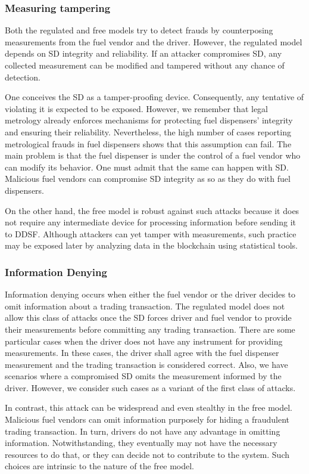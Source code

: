 \documentclass[sigplan]{acmart}
\begin{document}
\subsubsection{Measuring tampering}
Both the regulated and free models try to detect frauds by counterposing measurements from the fuel vendor and the driver.
However, the regulated model depends on SD integrity and reliability.
If an attacker compromises SD, any collected measurement can be modified and tampered without any chance of detection.

One conceives the SD as a tamper-proofing device.
Consequently, any tentative of violating it is expected to be exposed.
However, we remember that legal metrology already enforces mechanisms for protecting fuel dispensers' integrity and ensuring their reliability.
Nevertheless, the high number of cases reporting metrological frauds in fuel dispensers shows that this assumption can fail.
The main problem is that the fuel dispenser is under the control of a fuel vendor who can modify its behavior.
One must admit that the same can happen with SD.
Malicious fuel vendors can compromise SD integrity as so as they do with fuel dispensers.

On the other hand, the free model is robust against such attacks because it does not require any intermediate device for processing information before sending it to DDSF.
Although attackers can yet tamper with measurements, such practice may be exposed later by analyzing data in the blockchain using statistical tools.

\subsubsection{Information Denying}
Information denying occurs when either the fuel vendor or the driver decides to omit information about a trading transaction.
The regulated model does not allow this class of attacks once the SD forces driver and fuel vendor to provide their measurements before committing any trading transaction.
There are some particular cases when the driver does not have any instrument for providing measurements.
In these cases, the driver shall agree with the fuel dispenser measurement and the trading transaction is considered correct.
Also, we have scenarios where a compromised SD omits the measurement informed by the driver.
However, we consider such cases as a variant of the first class of attacks.

In contrast, this attack can be widespread and even stealthy in the free model.
Malicious fuel vendors can omit information purposely for hiding a fraudulent trading transaction.
In turn, drivers do not have any advantage in omitting information.
Notwithstanding,  they eventually may not have the necessary resources to do that, or they can decide not to contribute to the system.
Such choices are intrinsic to the nature of the free model.
\end{document}
